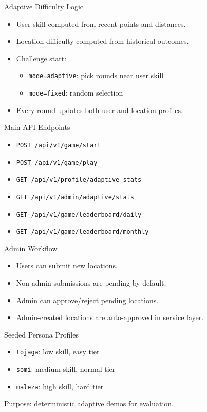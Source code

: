 \documentclass[aspectratio=169]{beamer}
\begin{document}
\begin{frame}{Adaptive Difficulty Logic}
  \begin{itemize}
    \item User skill computed from recent points and distances.
    \item Location difficulty computed from historical outcomes.
    \item Challenge start:
    \begin{itemize}
      \item \texttt{mode=adaptive}: pick rounds near user skill
      \item \texttt{mode=fixed}: random selection
    \end{itemize}
    \item Every round updates both user and location profiles.
  \end{itemize}
\end{frame}

\begin{frame}{Main API Endpoints}
  \begin{itemize}
    \item \texttt{POST /api/v1/game/start}
    \item \texttt{POST /api/v1/game/play}
    \item \texttt{GET /api/v1/profile/adaptive-stats}
    \item \texttt{GET /api/v1/admin/adaptive/stats}
    \item \texttt{GET /api/v1/game/leaderboard/daily}
    \item \texttt{GET /api/v1/game/leaderboard/monthly}
  \end{itemize}
\end{frame}

\begin{frame}{Admin Workflow}
  \begin{itemize}
    \item Users can submit new locations.
    \item Non-admin submissions are pending by default.
    \item Admin can approve/reject pending locations.
    \item Admin-created locations are auto-approved in service layer.
  \end{itemize}
\end{frame}

\begin{frame}{Seeded Persona Profiles}
  \begin{itemize}
    \item \texttt{tojaga}: low skill, easy tier
    \item \texttt{somi}: medium skill, normal tier
    \item \texttt{maleza}: high skill, hard tier
  \end{itemize}
  \vspace{0.3cm}
  Purpose: deterministic adaptive demos for evaluation.
\end{frame}
\end{document}

